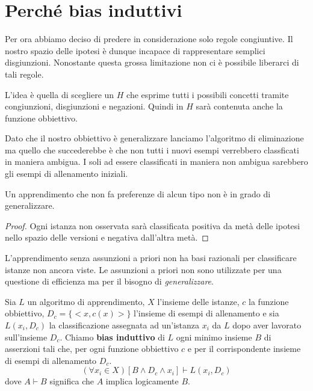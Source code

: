 \section{Perch\'e bias induttivi}
Per ora abbiamo deciso di predere in considerazione solo regole congiuntive. Il nostro spazio delle ipotesi \`e dunque
incapace di rappresentare semplici disgiunzioni. Nonostante questa grossa limitazione non ci \`e possibile liberarci
di tali regole.

L'idea \`e quella di scegliere un $H$ che esprime tutti i possibili concetti tramite congiunzioni, disgiunzioni e negazioni.
Quindi in $H$ sar\`a contenuta anche la funzione obbiettivo.

Dato che il nostro obbiettivo \`e generalizzare lanciamo l'algoritmo di eliminazione ma quello che succederebbe \`e che non
tutti i nuovi esempi verrebbero classficati in maniera ambigua. I soli ad essere classificati in maniera non ambigua
sarebbero gli esempi di allenamento iniziali.

\begin{theorem}
	Un apprendimento che non fa preferenze di alcun tipo non \`e in grado di generalizzare.
	\begin{proof}
		Ogni istanza non osservata sar\`a classificata positiva da met\`a delle ipotesi nello spazio delle versioni e
		negativa dall'altra met\`a.
	\end{proof}
\end{theorem}

L'apprendimento senza assunzioni a priori non ha basi razionali per classificare istanze non ancora viste. Le assunzioni
a priori non sono utilizzate per una questione di efficienza ma per il bisogno di \emph{generalizzare}.

\begin{definition}
	Sia $L$ un algoritmo di apprendimento, $X$ l'insieme delle istanze, $c$ la funzione obbiettivo, $D_c = \{<x, c(x)>\}$
	l'insieme di esempi di allenamento e sia $L(x_i, D_c)$ la classificazione assegnata ad un'istanza $x_i$ da $L$ dopo
	aver lavorato sull'insieme $D_c$. Chiamo \textbf{bias induttivo} di $L$ ogni minimo insieme $B$ di asserzioni tali che,
	per ogni funzione obbiettivo $c$ e per il corrispondente insieme di esempi di allenamento $D_c$.
	\[ (\forall x_i \in X) [B \wedge D_c \wedge x_i] \vdash L(x_i, D_c) \]
	dove $A \vdash B$ significa che $A$ implica logicamente $B$.
\end{definition}